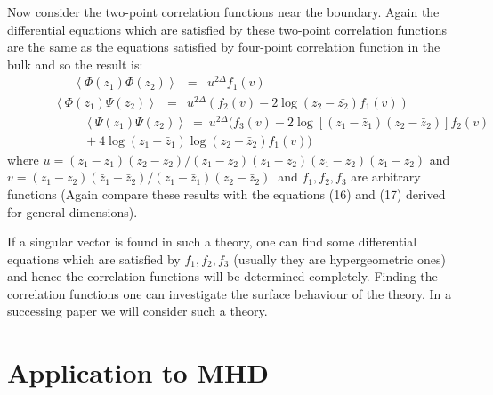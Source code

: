 Now consider the two-point correlation functions near the boundary. Again 
the differential equations which are satisfied by these two-point correlation
functions are the same as the equations satisfied by four-point correlation function in the bulk
and so the result is:
\begin{eqnarray}
\left<\Phi(z_{1})\Phi(z_{2})\right>&=&u^{2\Delta}f_{1}(v)\:\:\:\:\:\:\:\:\:\:\:\
\:\:\:\:\:\:\:\:\:\:\:\:\:\:\:\:\:\:\:\:\:\:\:\:\:\:\:\:\:\:\:\:\:\nonumber
\end{eqnarray}
\begin{eqnarray}
\left<\Phi(z_{1})\Psi(z_{2})\right>&=&u^{2\Delta}\left(f_{2}(v)-2\log(z_{2}-\bar{z_{2}})f_{1}(v)\right)\nonumber
\end{eqnarray}
\begin{eqnarray}
\:\:\:\:\:\:\:\:\:\:\:\:\:\:\:\:\:\:\:\:\:\:\:\:\:\:\left<\Psi(z_{1})\Psi(z_{2})\right>~=~
u^{2\Delta}(f_{3}(v)-2\log\left[(z_{1}-{\bar{z}}_{1})
(z_{2}-{\bar{z}}_{2})\right]f_{2}(v)
\nonumber\\ \:\:\:\:\:\:\:\:\:\:\:\:\:\:\:\:\:\:\:\:\:\:\:\:\:\:
+4\log(z_{1}-{\bar{z}}_{1})\log(z_{2}-{\bar{z}}_{2})f_{1}(v))
\end{eqnarray}
where $u={(z_{1}-{\bar{z}}_{1})(z_{2}-{\bar{z}}_{2})}/
{(z_{1}-z_{2})({\bar{z}}_{1}-{\bar{z}}_{2})
(z_{1}-{\bar{z}}_{2})({\bar{z}}_{1}-z_{2})}$ and
\newline
$v=(z_{1}-z_{2})({\bar{z}}_{1}-{\bar{z}}_{2})/(z_{1}-{\bar{z}}_{1})
(z_{2}-{\bar{z}}_{2})\:$ and
$f_{1},f_{2},f_{3}$ are arbitrary functions (Again compare these results with
the equations (16) and (17) derived for general dimensions).

If a singular vector is found in such a theory, one can find some differential
equations which are satisfied by $f_{1},f_{2},f_{3}$ (usually they are hypergeometric
ones) and hence the correlation functions will be determined completely. Finding
the correlation functions one can investigate the surface behaviour of the 
theory. In a successing paper we will consider such a theory.     

\section{Application to MHD}
%

